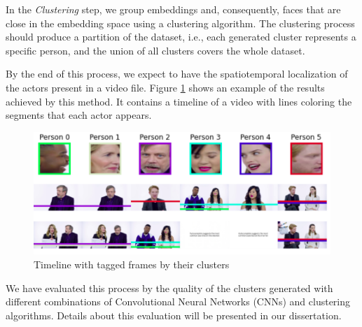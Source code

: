 In the \textit{Clustering} step, we group embeddings and, consequently, faces that are close in the embedding space using a clustering algorithm. 
The clustering process should produce a partition of the dataset, i.e., each generated cluster represents a specific person, and the union of all clusters covers the whole dataset.

By the end of this process, we expect to have the spatiotemporal localization of the actors present in a video file.
Figure \ref{fig:timeline} shows an example of the results achieved by this method. It contains a timeline of a video with lines coloring the segments that each actor appears.

\begin{figure}[!ht]
    \centering
    \includegraphics[width=0.6\linewidth]{img/webmedia/timeline2.png}
    \caption{Timeline with tagged frames by their clusters}
    \label{fig:timeline}
\end{figure}

We have evaluated this process by the quality of the clusters generated with different combinations of Convolutional Neural Networks (CNNs) and clustering algorithms. Details about this evaluation will be presented in our dissertation. 

